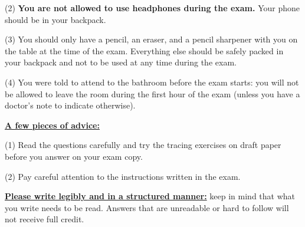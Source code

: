 \documentclass[11pt, oneside]{article}   	%
\begin{document}
(2) \textbf{You are not allowed to use headphones during the exam.} Your phone should be in your backpack.

(3) You should only have a pencil, an eraser, and a pencil sharpener with you on the table at the time of the exam. 
Everything else should be safely packed in your backpack and not to be used at any time during the exam.

(4) You were told to attend to the bathroom before the exam starts: 
you will not be allowed to leave the room during the first hour of the exam (unless you have a doctor’s note to indicate otherwise).

\textbf{\underline{A few pieces of advice:}}

(1) Read the questions carefully and try the tracing exercises on draft paper before you answer on your exam copy.

(2) Pay careful attention to the instructions written in the exam.

\textbf{\underline{Please write legibly and in a structured manner:}} 
keep in mind that what you write needs to be read. Answers that are unreadable or hard to follow will not receive full credit.




\clearpage
\end{document}
